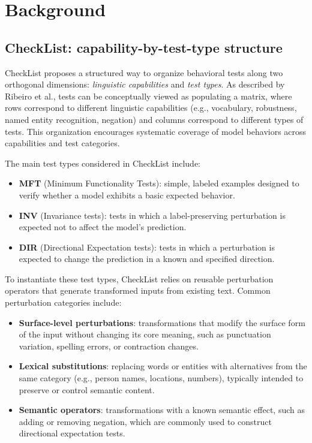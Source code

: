 \documentclass[11pt]{article}
\begin{document}
\section{Background}

\subsection{CheckList: capability-by-test-type structure}

CheckList proposes a structured way to organize behavioral tests along two orthogonal dimensions:
\emph{linguistic capabilities} and \emph{test types}.
As described by Ribeiro et al., tests can be conceptually viewed as populating a matrix,
where rows correspond to different linguistic capabilities (e.g., vocabulary, robustness,
named entity recognition, negation) and columns correspond to different types of tests.
This organization encourages systematic coverage of model behaviors across capabilities and test categories.

The main test types considered in CheckList include:
\begin{itemize}
  \item \textbf{MFT} (Minimum Functionality Tests): simple, labeled examples designed to verify whether a model exhibits a basic expected behavior.
  \item \textbf{INV} (Invariance tests): tests in which a label-preserving perturbation is expected not to affect the model’s prediction.
  \item \textbf{DIR} (Directional Expectation tests): tests in which a perturbation is expected to change the prediction in a known and specified direction.
\end{itemize}

To instantiate these test types, CheckList relies on reusable perturbation operators that generate
transformed inputs from existing text. Common perturbation categories include:
\begin{itemize}
  \item \textbf{Surface-level perturbations}: transformations that modify the surface form of the input
        without changing its core meaning, such as punctuation variation, spelling errors, or contraction changes.
  \item \textbf{Lexical substitutions}: replacing words or entities with alternatives from the same category
        (e.g., person names, locations, numbers), typically intended to preserve or control semantic content.
  \item \textbf{Semantic operators}: transformations with a known semantic effect, such as adding or removing negation,
        which are commonly used to construct directional expectation tests.
\end{itemize}
\end{document}

